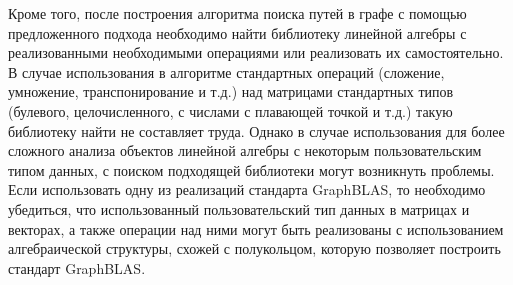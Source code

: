 Кроме того, после построения алгоритма поиска путей в графе с помощью предложенного подхода необходимо найти библиотеку линейной алгебры с реализованными необходимыми операциями или реализовать их самостоятельно. В случае использования в алгоритме стандартных операций (сложение, умножение, транспонирование и т.д.) над матрицами стандартных типов (булевого, целочисленного, с числами с плавающей точкой и т.д.) такую библиотеку найти не составляет труда. Однако в случае использования для более сложного анализа объектов линейной алгебры с некоторым пользовательским типом данных, с поиском подходящей библиотеки могут возникнуть проблемы. Если использовать одну из реализаций стандарта GraphBLAS, то необходимо убедиться, что использованный пользовательский тип данных в матрицах и векторах, а также операции над ними могут быть реализованы с использованием алгебраической структуры, схожей с полукольцом, которую позволяет построить стандарт GraphBLAS.

\clearpage